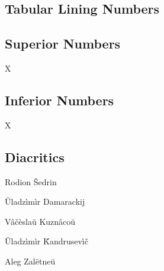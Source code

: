 \documentclass[12pt]{article}
\begin{document}
{}

\subsection*{Tabular Lining Numbers}

{}

\subsection*{Superior Numbers}

X

\subsection*{Inferior Numbers}

X

\subsection*{Diacritics}

\mbox{}\par
Rodion \^{S}edrin 

\u{U}ladz\`{i}m\`{i}r Damarackij

V\^{a}\v{c}\`{e}sla\u{u} Kuzn\^{a}co\u{u}

\u{U}ladz\`{i}m\`{i}r \v{K}andrusev\`{i}\v{c}

Aleg Zal\"{e}tne\u{u}
\end{document}
